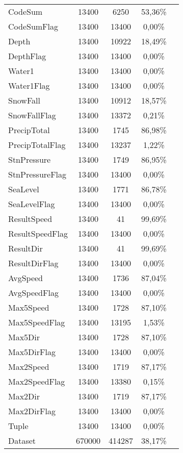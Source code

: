 \begin{longtable}{lcccc}
		CodeSum			& 13400 & 6250	     & 53,36\%  	\\
		CodeSumFlag		& 13400 & 13400	     & 0,00\%  		\\	
		Depth			& 13400 & 10922	     & 18,49\%  	\\
		DepthFlag		& 13400 & 13400   	 & 0,00\%		\\	
		Water1			& 13400 & 13400   	 & 0,00\%		\\
		Water1Flag		& 13400 & 13400   	 & 0,00\%		\\	
		SnowFall		& 13400 & 10912   	 & 18,57\%		\\	
		SnowFallFlag	& 13400 & 13372   	 & 0,21\%		\\		
		PrecipTotal		& 13400 & 1745   	 & 86,98\%		\\	
		PrecipTotalFlag	& 13400 & 13237   	 & 1,22\%		\\		
		StnPressure		& 13400 & 1749   	 & 86,95\%		\\	
		StnPressureFlag	& 13400 & 13400   	 & 0,00\%		\\		
		SeaLevel		& 13400 & 1771   	 & 86,78\%		\\	
		SeaLevelFlag	& 13400 & 13400   	 & 0,00\%		\\		
		ResultSpeed		& 13400 & 41   	 	 & 99,69\%		\\	
		ResultSpeedFlag	& 13400 & 13400   	 & 0,00\%		\\		
		ResultDir		& 13400 & 41   	 	 & 99,69\%		\\			
		ResultDirFlag	& 13400 & 13400   	 & 0,00\%		\\		
		AvgSpeed		& 13400 & 1736   	 & 87,04\%		\\	
		AvgSpeedFlag	& 13400 & 13400   	 & 0,00\%		\\		
		Max5Speed		& 13400 & 1728   	 & 87,10\%		\\	
		Max5SpeedFlag	& 13400 & 13195   	 & 1,53\%		\\		
		Max5Dir			& 13400 & 1728   	 & 87,10\%		\\
		Max5DirFlag		& 13400 & 13400   	 & 0,00\%		\\	
		Max2Speed		& 13400 & 1719   	 & 87,17\%		\\	
		Max2SpeedFlag	& 13400 & 13380   	 & 0,15\%		\\		
		Max2Dir			& 13400 & 1719   	 & 87,17\%		\\
		Max2DirFlag		& 13400 & 13400   	 & 0,00\%		\\	
		\midrule
		Tuple 			& 13400  &	13400	 & 0,00\%		\\
		Dataset  		& 670000 &	414287 	 & 38,17\%		\\
		\bottomrule
		
	\end{longtable}
	\label{tab:completezza daily}

